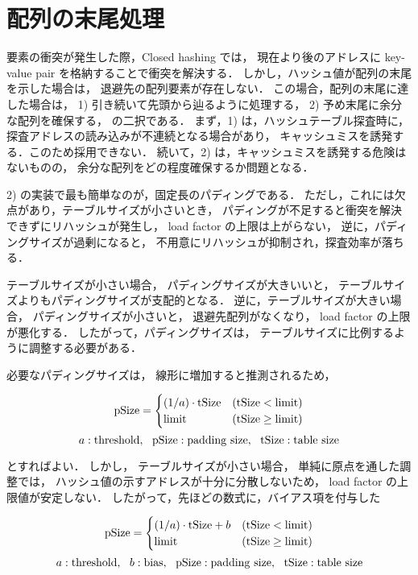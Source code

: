 \section{配列の末尾処理}

要素の衝突が発生した際，Closed hashing では，
現在より後のアドレスに key-value pair を格納することで衝突を解決する．
しかし，ハッシュ値が配列の末尾を示した場合は，
退避先の配列要素が存在しない．
この場合，配列の末尾に達した場合は，
1) 引き続いて先頭から辿るように処理する，
2) 予め末尾に余分な配列を確保する，
の二択である．
まず，1) は，ハッシュテーブル探査時に，
探査アドレスの読み込みが不連続となる場合があり，
キャッシュミスを誘発する．このため採用できない．
続いて，2) は，キャッシュミスを誘発する危険はないものの，
余分な配列をどの程度確保するか問題となる．

2) の実装で最も簡単なのが，固定長のパディングである．
ただし，これには欠点があり，テーブルサイズが小さいとき，
パディングが不足すると衝突を解決できずにリハッシュが発生し，
load factor の上限は上がらない，
逆に，パディングサイズが過剰になると，
不用意にリハッシュが抑制され，探査効率が落ちる．

テーブルサイズが小さい場合，
パディングサイズが大きいいと，
テーブルサイズよりもパディングサイズが支配的となる．
逆に，テーブルサイズが大きい場合，
パディングサイズが小さいと，
退避先配列がなくなり，
load factor の上限が悪化する．
したがって，パディングサイズは，
テーブルサイズに比例するように調整する必要がある．

必要なパディングサイズは，
線形に増加すると推測されるため，

\[
  {\rm pSize} = \begin{cases}
    (1/a) \cdot {\rm tSize} & ({\rm tSize}<{\rm limit}) \\
    {\rm limit}    & ({\rm tSize}\geq{\rm limit})
  \end{cases}
\]
\[
  a: {\rm threshold}, \ \ 
  {\rm pSize}: {\rm padding \ size}, \ \ 
  {\rm tSize: table \ size}
\]

とすればよい．
しかし，
テーブルサイズが小さい場合，
単純に原点を通した調整では，
ハッシュ値の示すアドレスが十分に分散しないため，
load factor の上限値が安定しない．
したがって，先ほどの数式に，バイアス項を付与した

\[
  {\rm pSize} = \begin{cases}
    (1/a) \cdot {\rm tSize} + b & ({\rm tSize}<{\rm limit}) \\
    {\rm limit}    & ({\rm tSize}\geq{\rm limit})
  \end{cases}
\]
\[
  a: {\rm threshold}, \ \ 
  b: {\rm bias}, \ \ 
  {\rm pSize}: {\rm padding \ size}, \ \ 
  {\rm tSize}: {\rm table \ size}
\]

